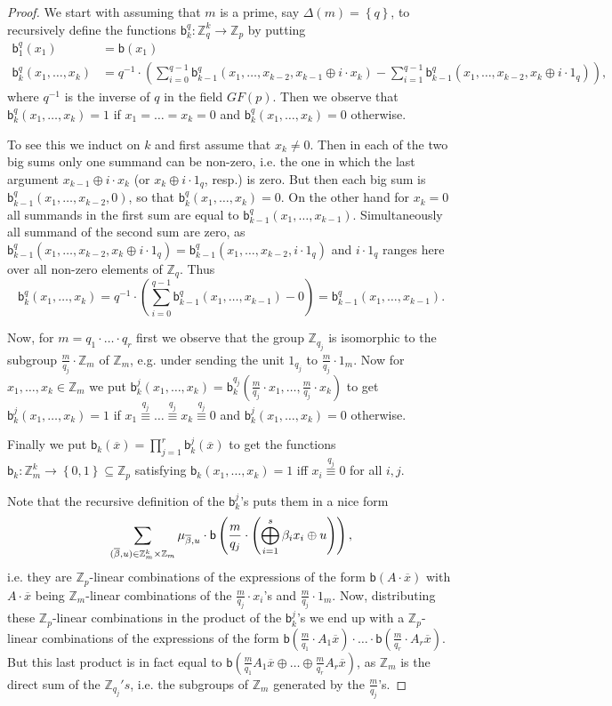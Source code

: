 \documentclass[11pt,a4paper]{amsart}
\newcommand{\m}[1]{{\uppercase {\bf{#1}}}}
\newcommand{\set}[1]{{\left\{ {#1} \right\} }}
\newcommand{\ci}{\subseteq}
\renewcommand{\o}[1]{\overline {#1}}
\newcommand{\map}{\longrightarrow}
\newcommand{\congruent}[1]{\stackrel{#1}{\equiv}}
\newcommand{\z}{\mathbb{Z}}
\renewcommand{\b}{\textsf{b}}
\newcommand{\sdiv}[1]{\Delta\left(#1\right)}    \newcommand{\ppdiv}{\delta}
\begin{document}
\begin{proof}
We start with assuming that $m$ is a prime, say $\sdiv{m}=\set{q}$, to recursively define
the functions $\b_k^q : \z_q^k\map\z_p$ by putting
\begin{align*}
\b_1^q(x_1) &= \b(x_1)\\
\b_{k}^q(x_1,\ldots,x_{k}) &=
q^{-1}\cdot\left(
\sum_{i=0}^{q-1} \b_{k-1}^q(x_1,\ldots,x_{k-2},x_{k-1}\oplus i\cdot x_{k}) -
\sum_{i=1}^{q-1} \b_{k-1}^q(x_1,\ldots,x_{k-2},x_{k}\oplus i\cdot 1_q)\right),
\end{align*}
where $q^{-1}$ is the inverse of $q$ in the field $GF(p)$.
Then we observe that
$\b_k^q(x_1,\ldots,x_{k})=1$ if $x_1=\ldots=x_{k}=0$ and $\b_k^q(x_1,\ldots,x_{k})=0$ otherwise.

To see this we induct on $k$ and first assume that $x_k\neq 0$.
Then in each of the two big sums only one summand can be non-zero,
i.e. the one in which the last argument $x_{k-1}\oplus i\cdot x_{k}$ (or $x_{k}\oplus i\cdot 1_q$, resp.)
is zero.
But then each big sum is $\b_{k-1}^q(x_1,\ldots,x_{k-2},0)$, so that $\b_k^q(x_1,\ldots,x_{k})=0$.
On the other hand for $x_k=0$ all summands in the first sum are equal to $\b_{k-1}^q(x_1,\ldots,x_{k-1})$.
Simultaneously all summand of the second sum are zero, as
$\b_{k-1}^q(x_1,\ldots,x_{k-2},x_{k}\oplus i\cdot 1_q)=\b_{k-1}^q(x_1,\ldots,x_{k-2},i\cdot 1_q)$
and $i\cdot 1_q$ ranges here over all non-zero elements of $\z_q$.
Thus
\[
\b_{k}^q(x_1,\ldots,x_{k}) =
q^{-1}\cdot\left(
\sum_{i=0}^{q-1} \b_{k-1}^q(x_1,\ldots,x_{k-1}) - 0\right) =
\b_{k-1}^q(x_1,\ldots,x_{k-1}).
\]

Now, for $m=q_1\cdot\ldots\cdot q_r$ first we observe that the group $\z_{q_j}$
is isomorphic to the subgroup $\frac{m}{q_j}\cdot\z_m$ of $\z_m$,
e.g. under sending the unit $1_{q_j}$ to $\frac{m}{q_j}\cdot 1_m$.
Now for $x_1,\ldots,x_{k}\in\z_m$ we put
$\b_k^j(x_1,\ldots,x_{k})=\b_k^{q_j}(\frac{m}{q_j}\cdot x_1,\ldots,\frac{m}{q_j}\cdot x_{k})$
to get
$\b_k^j(x_1,\ldots,x_{k})=1$ if $x_1\congruent{q_j}\ldots\congruent{q_j} x_{k}\congruent{q_j}0$
and $\b_k^j(x_1,\ldots,x_{k})=0$ otherwise.

Finally we put
\(
\b_k(\o x) = \prod_{j=1}^r \b_k^j(\o x)
\)
to get the functions $\b_k : \z_m^k\map\set{0,1}\ci\z_p$ satisfying
$\b_k(x_1,\ldots,x_{k})=1$ iff $x_i\congruent{q_j}0$ for all $i,j$.

Note that the recursive definition of the $\b_k^j$'s puts them in a nice form
\[
\sum_{(\o\beta,u)\in\m \z_m^k\times\z_m}
\mu_{\o\beta,u}\cdot \b\left(\frac{m}{q_j}\cdot\left(\bigoplus_{i=1}^s \beta_i x_i\oplus u\right)\right),
\]
i.e. they are $\z_p$-linear combinations of the expressions of the form $\b(A\cdot\o x)$ with
$A\cdot\o x$ being $\z_m$-linear combinations
of the $\frac{m}{q_j}\cdot x_i$'s and $\frac{m}{q_j}\cdot 1_m$.
Now, distributing these $\z_p$-linear combinations in the product of the $\b_k^j$'s
we end up with a $\z_p$-linear combinations of the expressions of the form
$\b(\frac{m}{q_1}\cdot A_1\o x)\cdot\ldots\cdot\b(\frac{m}{q_r}\cdot A_r\o x)$.
But this last product is in fact equal to
$\b(\frac{m}{q_1} A_1\o x \oplus\ldots\oplus\frac{m}{q_r} A_r\o x)$,
as $\z_m$ is the direct sum of the $\z_{q_j}'s$,
i.e. the subgroups of $\z_m$ generated by the $\frac{m}{q_j}$'s.


\end{proof}
\end{document}
